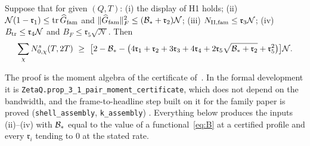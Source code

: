 \begin{proposition}\label{prop:3.1}
Suppose that for given $(Q,T)$: \textup{(i)} the display of H1 holds; \textup{(ii)} $\mathcal N(1-\mathfrak r_1)\le\operatorname{tr}\widehat G_{\rm fam}$
and $\lVert \widehat G_{\rm fam}\rVert_F^2\le(\mathcal B_*+\mathfrak r_2)\mathcal N$; \textup{(iii)} $N_{\rm II,fam}\le \mathfrak r_3\mathcal N$;
\textup{(iv)} $B_{\rm tr}\le \mathfrak r_4\mathcal N$ and $B_F\le \mathfrak r_5\sqrt{\mathcal N}$. Then
\[
\sum_\chi N^s_{0,\chi}(T,2T)\ \ge\ \bigl[2-\Bfun_*-\bigl(4\mathfrak r_1+\mathfrak r_2+3\mathfrak r_3+4\mathfrak r_4+2\mathfrak r_5\sqrt{\Bfun_*+\mathfrak r_2}+\mathfrak r_5^2\bigr)\bigr]\mathcal N .
\]
\end{proposition}
The proof is the moment algebra of the certificate of~\cite{AF}. In the formal development it is
\texttt{ZetaQ.prop\_3\_1\_pair\_moment\_certificate}, which does not depend on the bandwidth, and the frame-to-headline step
built on it for the family paper is proved (\texttt{shell\_assembly}, \texttt{k\_assembly}) \tagL.
Everything below produces the inputs (ii)--(iv) with $\mathcal B_*$ equal to the value of a functional~\eqref{eq:B} at a certified
profile and every $\mathfrak r_i$ tending to $0$ at the stated rate.

